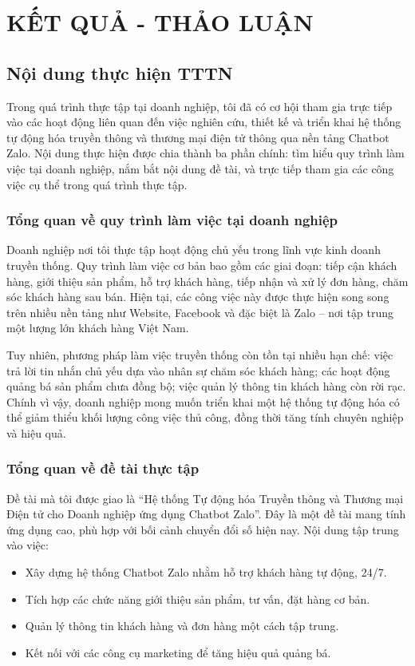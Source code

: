 \chapter{KẾT QUẢ - THẢO LUẬN}

\section{Nội dung thực hiện TTTN}

Trong quá trình thực tập tại doanh nghiệp, tôi đã có cơ hội tham gia trực tiếp vào
các hoạt động liên quan đến việc nghiên cứu, thiết kế và triển khai hệ thống tự động
hóa truyền thông và thương mại điện tử thông qua nền tảng Chatbot Zalo. Nội dung
thực hiện được chia thành ba phần chính: tìm hiểu quy trình làm việc tại doanh nghiệp,
nắm bắt nội dung đề tài, và trực tiếp tham gia các công việc cụ thể trong quá trình
thực tập.

\subsection*{Tổng quan về quy trình làm việc tại doanh nghiệp}
Doanh nghiệp nơi tôi thực tập hoạt động chủ yếu trong lĩnh vực kinh doanh truyền thống. Quy trình làm việc cơ bản bao gồm các giai đoạn: tiếp cận khách
hàng, giới thiệu sản phẩm, hỗ trợ khách hàng, tiếp nhận và xử lý đơn hàng, chăm sóc
khách hàng sau bán. Hiện tại, các công việc này được thực hiện song song trên nhiều
nền tảng như Website, Facebook và đặc biệt là Zalo – nơi tập trung một lượng lớn
khách hàng Việt Nam.

Tuy nhiên, phương pháp làm việc truyền thống còn tồn tại nhiều hạn chế: việc
trả lời tin nhắn chủ yếu dựa vào nhân sự chăm sóc khách hàng; các hoạt động quảng bá
sản phẩm chưa đồng bộ; việc quản lý thông tin khách hàng còn rời rạc. Chính vì vậy,
doanh nghiệp mong muốn triển khai một hệ thống tự động hóa có thể giảm thiểu khối
lượng công việc thủ công, đồng thời tăng tính chuyên nghiệp và hiệu quả.

\subsection*{Tổng quan về đề tài thực tập}
Đề tài mà tôi được giao là “Hệ thống Tự động hóa Truyền thông và Thương mại
Điện tử cho Doanh nghiệp ứng dụng Chatbot Zalo”. Đây là một đề tài mang tính ứng
dụng cao, phù hợp với bối cảnh chuyển đổi số hiện nay. Nội dung tập trung vào việc:

\begin{itemize}
    \item Xây dựng hệ thống Chatbot Zalo nhằm hỗ trợ khách hàng tự động, 24/7.
    \item Tích hợp các chức năng giới thiệu sản phẩm, tư vấn, đặt hàng cơ bản.
    \item Quản lý thông tin khách hàng và đơn hàng một cách tập trung.
    \item Kết nối với các công cụ marketing để tăng hiệu quả quảng bá.
\end{itemize}

